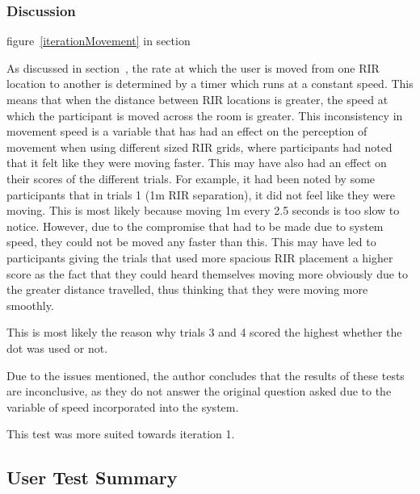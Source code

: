 \documentclass[../../main.tex]{subfiles}
\begin{document}
			\subsubsection{Discussion}

				figure~\ref{iterationMovement} in section 

			As discussed in section~, the rate at which the user is moved from one \ac{RIR} location to another is determined by a timer which runs at a constant speed. This means that when the distance between \ac{RIR} locations is greater, the speed at which the participant is moved across the room is greater. This inconsistency in movement speed is a variable that has had an effect on the perception of movement when using different sized \ac{RIR} grids, where participants had noted that it felt like they were moving faster. This may have also had an effect on their scores of the different trials. For example, it had been noted by some participants that in trials 1 (1m \ac{RIR} separation), it did not feel like they were moving. This is most likely because moving 1m every 2.5 seconds is too slow to notice. However, due to the compromise that had to be made due to system speed, they could not be moved any faster than this. This may have led to participants giving the trials that used more spacious \ac{RIR} placement a higher score as the fact that they could heard themselves moving more obviously due to the greater distance travelled, thus thinking that they were moving more smoothly.

			This is most likely the reason why trials 3 and 4 scored the highest whether the dot was used or not.

			Due to the issues mentioned, the author concludes that the results of these tests are inconclusive, as they do not answer the original question asked due to the variable of speed incorporated into the system.

			This test was more suited towards iteration 1.

		\subsection{User Test Summary}

\end{document}
